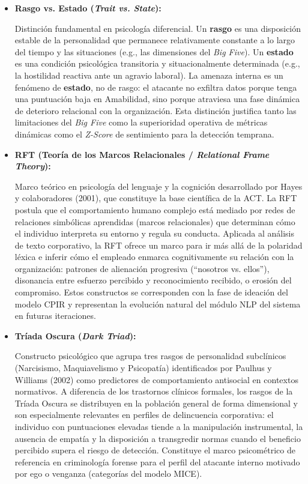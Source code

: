 \documentclass[IB]{TFUOC}%
\begin{document}
\begin{itemize}
    \item \textbf{Rasgo vs. Estado ({\textit{Trait vs. State}}):}
    
    Distinción fundamental en psicología diferencial. Un \textbf{rasgo} es una disposición estable de la personalidad que permanece relativamente constante a lo largo del tiempo 
    y las situaciones (e.g., las dimensiones del \textit{Big Five}). 
    Un \textbf{estado} es una condición psicológica transitoria y situacionalmente determinada (e.g., la hostilidad reactiva ante un agravio laboral). La amenaza interna es un fenómeno de \textbf{estado}, no de rasgo: el atacante no exfiltra datos porque tenga una puntuación baja en Amabilidad, sino porque atraviesa una fase dinámica de deterioro relacional con la organización. Esta distinción justifica tanto las limitaciones del \textit{Big Five} como la superioridad operativa de métricas dinámicas como el \textit{Z-Score} de sentimiento para la detección temprana.

    \item \textbf{RFT (Teoría de los Marcos Relacionales / 
    \textit{Relational Frame Theory}):}
    
    Marco teórico en psicología del lenguaje y la cognición desarrollado por Hayes y colaboradores (2001), que constituye la base científica de la ACT. La RFT postula que el 
    comportamiento humano complejo está mediado por redes de 
    relaciones simbólicas aprendidas (marcos relacionales) que determinan cómo el individuo interpreta su entorno y regula su conducta. Aplicada al análisis de texto corporativo, 
    la RFT ofrece un marco para ir más allá de la polaridad léxica e inferir cómo el empleado enmarca cognitivamente su relación con la organización: patrones de alienación 
    progresiva (``nosotros vs. ellos''), disonancia entre esfuerzo percibido y reconocimiento recibido, o erosión del compromiso. Estos constructos se corresponden con la 
    fase de ideación del modelo CPIR y representan la evolución natural del módulo NLP del sistema en futuras iteraciones.

    \item \textbf{Tríada Oscura (\textit{Dark Triad}):}
    
    Constructo psicológico que agrupa tres rasgos de personalidad subclínicos (Narcisismo, Maquiavelismo y Psicopatía) identificados por Paulhus y Williams (2002) como predictores 
    de comportamiento antisocial en contextos normativos. A diferencia de los trastornos clínicos formales, los rasgos de la Tríada Oscura se distribuyen en la población general 
    de forma dimensional y son especialmente relevantes en perfiles de delincuencia corporativa: el individuo con puntuaciones elevadas tiende a la manipulación instrumental, la ausencia de empatía y la disposición a transgredir normas 
    cuando el beneficio percibido supera el riesgo de detección. 
    Constituye el marco psicométrico de referencia en criminología forense para el perfil del atacante interno motivado por ego o venganza (categorías del modelo MICE).


\end{itemize}
\end{document}
